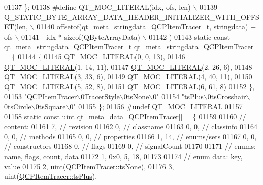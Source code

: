\begin{DoxyCode}
01137 \};
01138 \textcolor{preprocessor}{#define QT\_MOC\_LITERAL(idx, ofs, len) \(\backslash\)}
01139 \textcolor{preprocessor}{    Q\_STATIC\_BYTE\_ARRAY\_DATA\_HEADER\_INITIALIZER\_WITH\_OFFSET(len, \(\backslash\)}
01140 \textcolor{preprocessor}{    offsetof(qt\_meta\_stringdata\_QCPItemTracer\_t, stringdata) + ofs \(\backslash\)}
01141 \textcolor{preprocessor}{        - idx * sizeof(QByteArrayData) \(\backslash\)}
01142 \textcolor{preprocessor}{    )}
01143 \textcolor{keyword}{static} \textcolor{keyword}{const} \hyperlink{a00067_d5/df1/a00206}{qt\_meta\_stringdata\_QCPItemTracer\_t} 
      qt\_meta\_stringdata\_QCPItemTracer = \{
01144     \{
01145 \hyperlink{a00067_a75bb9482d242cde0a06c9dbdc6b83abe}{QT\_MOC\_LITERAL}(0, 0, 13),
01146 \hyperlink{a00067_a75bb9482d242cde0a06c9dbdc6b83abe}{QT\_MOC\_LITERAL}(1, 14, 11),
01147 \hyperlink{a00067_a75bb9482d242cde0a06c9dbdc6b83abe}{QT\_MOC\_LITERAL}(2, 26, 6),
01148 \hyperlink{a00067_a75bb9482d242cde0a06c9dbdc6b83abe}{QT\_MOC\_LITERAL}(3, 33, 6),
01149 \hyperlink{a00067_a75bb9482d242cde0a06c9dbdc6b83abe}{QT\_MOC\_LITERAL}(4, 40, 11),
01150 \hyperlink{a00067_a75bb9482d242cde0a06c9dbdc6b83abe}{QT\_MOC\_LITERAL}(5, 52, 8),
01151 \hyperlink{a00067_a75bb9482d242cde0a06c9dbdc6b83abe}{QT\_MOC\_LITERAL}(6, 61, 8)
01152     \},
01153     \textcolor{stringliteral}{"QCPItemTracer\(\backslash\)0TracerStyle\(\backslash\)0tsNone\(\backslash\)0"}
01154     \textcolor{stringliteral}{"tsPlus\(\backslash\)0tsCrosshair\(\backslash\)0tsCircle\(\backslash\)0tsSquare\(\backslash\)0"}
01155 \};
01156 \textcolor{preprocessor}{#undef QT\_MOC\_LITERAL}
01157 
01158 \textcolor{keyword}{static} \textcolor{keyword}{const} uint qt\_meta\_data\_QCPItemTracer[] = \{
01159 
01160  \textcolor{comment}{// content:}
01161        7,       \textcolor{comment}{// revision}
01162        0,       \textcolor{comment}{// classname}
01163        0,    0, \textcolor{comment}{// classinfo}
01164        0,    0, \textcolor{comment}{// methods}
01165        0,    0, \textcolor{comment}{// properties}
01166        1,   14, \textcolor{comment}{// enums/sets}
01167        0,    0, \textcolor{comment}{// constructors}
01168        0,       \textcolor{comment}{// flags}
01169        0,       \textcolor{comment}{// signalCount}
01170 
01171  \textcolor{comment}{// enums: name, flags, count, data}
01172        1, 0x0,    5,   18,
01173 
01174  \textcolor{comment}{// enum data: key, value}
01175        2, uint(\hyperlink{a00042_a2f05ddb13978036f902ca3ab47076500aac27462c79146225bfa8fba24d2ee8a4}{QCPItemTracer::tsNone}),
01176        3, uint(\hyperlink{a00042_a2f05ddb13978036f902ca3ab47076500a3323fb04017146e4885e080a459472fa}{QCPItemTracer::tsPlus}),

\end{DoxyCode}
